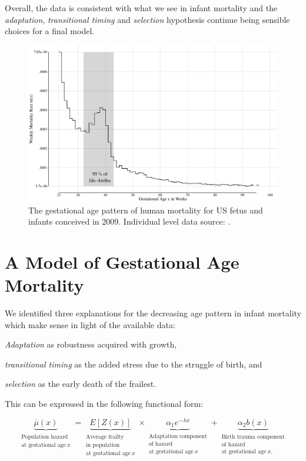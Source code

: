 \documentclass[
  12pt
]{scrartcl}
\begin{document}
Overall, the data is consistent with what we see in infant mortality and the \emph{adaptation}, \emph{transitional timing} and \emph{selection} hypothesis continue being sensible choices for a final model.

\begin{figure}[!htb]
  \centering
  \includegraphics[width = \textwidth]{./fig/us_fimort_2009_mx.pdf}
  \caption{The gestational age pattern of human mortality for US fetus and infants conceived in 2009. Individual level data source: \cite{DVS2015}.}
  \label{fig:us_fimort_2009_mx}
\end{figure}

\section{A Model of Gestational Age Mortality} %
\label{sec:modelling_the_gestational_age_pattern_of_human_mortality}

We identified three explanations for the decreasing age pattern in infant mortality which make sense in light of the available data:
\begin{inparaenum}
  \item \emph{Adaptation} as robustness acquired with growth,
  \item \emph{transitional timing} as the added stress due to the struggle of birth, and
  \item \emph{selection} as the early death of the frailest.
\end{inparaenum}
This can be expressed in the following functional form:

$$
  \underbrace{
    \overline{\mu}(x)
  }_{\substack{
    \text{Population hazard}\\ \text{at gestational age}~x
  }} =
  \underbrace{
    E[Z(x)]
  }_{\substack{
    \text{Average frailty}\\ \text{in population}\\ \text{at gestational age}~x
  }} \times
  \underbrace{
    \alpha_1 e^{-\lambda x}
  }_{\substack{
    \text{Adaptation component}\\ \text{of hazard}\\ \text{at gestational age}~x
  }} +
  \underbrace{
    \alpha_2 b(x)
  }_{\substack{
    \text{Birth trauma component}\\ \text{of hazard}\\ \text{at gestational age}~x.
  }}
$$
\end{document}
